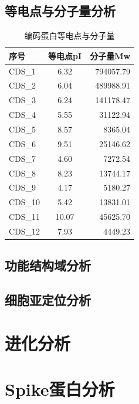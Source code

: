 \documentclass[supercite]{HustGraduPaper}
\begin{document}
	\subsection{等电点与分子量分析}
	\begin{table}[H]
  \begin{center}
    \begin{tabular}{|l|c|r|} %
			\hline
      \textbf{序号} & \textbf{等电点pI} & \textbf{分子量Mw}\\
      \hline
			  CDS\_1 & 6.32 & 794057.79\\
        CDS\_2 & 6.04 & 489988.91\\
        CDS\_3 & 6.24 & 141178.47\\
        CDS\_4 & 5.55 & 31122.94\\
        CDS\_5 & 8.57 & 8365.04\\
        CDS\_6 & 9.51 & 25146.62\\
        CDS\_7 & 4.60 & 7272.54\\
  	    CDS\_8 & 8.23 & 13744.17\\
  	    CDS\_9 & 4.17 & 5180.27\\
  	    CDS\_10 & 5.42 & 13831.01\\
  	    CDS\_11 & 10.07 & 45625.70\\
  	    CDS\_12 & 7.93 & 4449.23\\ \hline
    \end{tabular}
		    \caption{编码蛋白等电点与分子量}
  \end{center}
\end{table}
	\subsection{功能结构域分析}

	\subsection{细胞亚定位分析}
\section{进化分析}
\section{Spike蛋白分析}
\end{document}
